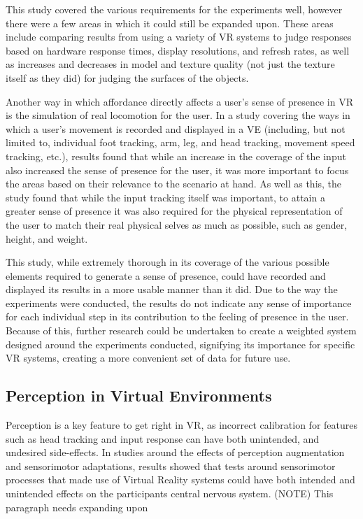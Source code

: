 		This study covered the various requirements for the experiments well, however there were a few areas in which it could still be expanded upon.
		These areas include comparing results from using a variety of VR systems to judge responses based on hardware response times, display resolutions, and refresh rates, as well as increases and decreases in model and texture quality (not just the texture itself as they did) for judging the surfaces of the objects.

		Another way in which affordance directly affects a user's sense of presence in VR is the simulation of real locomotion for the user.
		In a study \cite{Turchet2015} covering the ways in which a user's movement is recorded and displayed in a VE (including, but not limited to, individual foot tracking, arm, leg, and head tracking, movement speed tracking, etc.), results found that while an increase in the coverage of the input also increased the sense of presence for the user, it was more important to focus the areas based on their relevance to the scenario at hand.
		As well as this, the study found that while the input tracking itself was important, to attain a greater sense of presence it was also required for the physical representation of the user to match their real physical selves as much as possible, such as gender, height, and weight.

		This study, while extremely thorough in its coverage of the various possible elements required to generate a sense of presence, could have recorded and displayed its results in a more usable manner than it did.
		Due to the way the experiments were conducted, the results do not indicate any sense of importance for each individual step in its contribution to the feeling of presence in the user.
		Because of this, further research could be undertaken to create a weighted system designed around the experiments conducted, signifying its importance for specific VR systems, creating a more convenient set of data for future use.

	\subsection{Perception in Virtual Environments}
	\label{lr:vr:perception}
		Perception is a key feature to get right in VR, as incorrect calibration for features such as head tracking and input response can have both unintended, and undesired side-effects. In studies \cite{Wright2006}  \cite{Wright2009} \cite{Wright2011} \cite{Wright2013} \cite{Wright2014} around the effects of perception augmentation and sensorimotor adaptations, results showed that tests around sensorimotor processes that made use of Virtual Reality systems could have both intended and unintended effects on the participants central nervous system. 
		(NOTE) This paragraph needs expanding upon


